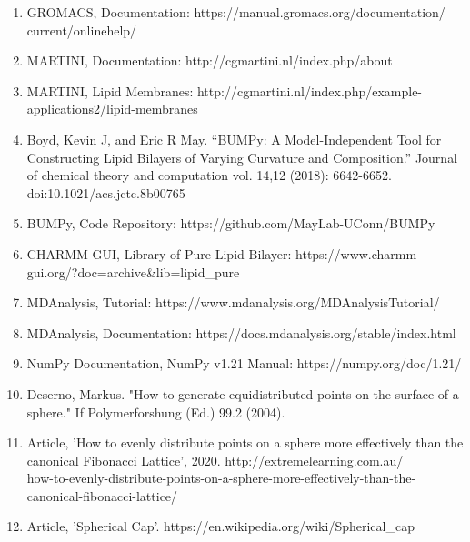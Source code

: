 \documentclass[12pt, a4paper]{report}
\begin{document}
\begin{enumerate}
    \item GROMACS, Documentation: https://manual.gromacs.org/documentation/
    \\current/onlinehelp/ 
    \item MARTINI, Documentation: http://cgmartini.nl/index.php/about 
    \item MARTINI, Lipid Membranes: http://cgmartini.nl/index.php/example-applications2/lipid-membranes 
    \item Boyd, Kevin J, and Eric R May. “BUMPy: A Model-Independent Tool for Constructing Lipid Bilayers of Varying Curvature and Composition.” Journal of chemical theory and computation vol. 14,12 (2018): 6642-6652. doi:10.1021/acs.jctc.8b00765 
    \item BUMPy, Code Repository: https://github.com/MayLab-UConn/BUMPy 
    \item CHARMM-GUI, Library of Pure Lipid Bilayer: 
    https://www.charmm-gui.org/?doc=archive&lib=lipid\_pure
    \item MDAnalysis, Tutorial: https://www.mdanalysis.org/MDAnalysisTutorial/ 
    \item MDAnalysis, Documentation: https://docs.mdanalysis.org/stable/index.html 
    \item NumPy Documentation, NumPy v1.21 Manual: 
    https://numpy.org/doc/1.21/ 
    \item Deserno, Markus. "How to generate equidistributed points on the surface of a sphere." If Polymerforshung (Ed.) 99.2 (2004). 
    \item Article, 'How to evenly distribute points on a sphere more effectively than the canonical Fibonacci Lattice', 2020. 
    http://extremelearning.com.au/
    \\how-to-evenly-distribute-points-on-a-sphere-more-effectively-than-the-
    \\canonical-fibonacci-lattice/ 
    \item Article, 'Spherical Cap'. https://en.wikipedia.org/wiki/Spherical\_cap 
    
\end{enumerate} 
\end{document}
